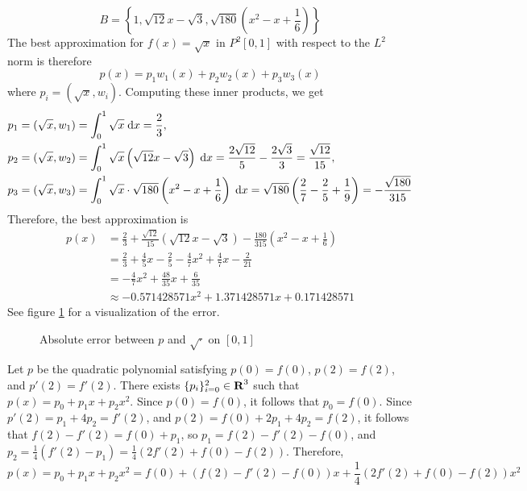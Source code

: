 \documentclass{homework}
\begin{document}
	\begin{equation}
		B = \left\{1, \sqrt{12}x - \sqrt{3}, \sqrt{180}\left(x^2-x+\frac{1}{6}\right)\right\}
	\end{equation}
	The best approximation for $f(x) = \sqrt{x}$ in $P^2[0,1]$ with respect to the $L^2$ norm is therefore
	\begin{equation}
		p(x) = p_1w_1(x) + p_2w_2(x) + p_3w_3(x)
	\end{equation}
	where $p_i = (\sqrt{x}, w_i)$. Computing these inner products, we get
	\begin{align}
		p_1 &= (\sqrt{x}, w_1) = \int_0^1\sqrt{x}\;\text{d} x = \frac{2}{3}, \\
		p_2 &= (\sqrt{x}, w_2) = \int_0^1\sqrt{x}\left(\sqrt{12}x - \sqrt{3}\right)\;\text{d} x = \frac{2\sqrt{12}}{5} - \frac{2\sqrt{3}}{3} = \frac{\sqrt{12}}{15}, \\
		p_3 &= (\sqrt{x}, w_3) = \int_0^1 \sqrt{x}\cdot\sqrt{180}\left(x^2 - x + \frac{1}{6}\right)\;\text{d} x = \sqrt{180}\left(\frac{2}{7} - \frac{2}{5} + \frac{1}{9}\right) = -\frac{\sqrt{180}}{315}
	\end{align}
	Therefore, the best approximation is
	\begin{align}
		p(x) &= \frac{2}{3} + \frac{\sqrt{12}}{15}\left(\sqrt{12}x - \sqrt{3}\right) - \frac{180}{315}\left(x^2-x+\frac{1}{6}\right) \\
		&= \frac{2}{3} + \frac{4}{5}x - \frac{2}{5} - \frac{4}{7}x^2 + \frac{4}{7}x - \frac{2}{21} \\
		&= -\frac{4}{7}x^2 + \frac{48}{35}x +\frac{6}{35}\\
		&\approx -0.571428571 x^2 + 1.371428571x + 0.171428571
	\end{align}
	See figure \ref{fig:best_sqrt_error} for a visualization of the error.
	\begin{figure}	
		\centering
		\caption{Absolute error between $p$ and $\sqrt{\cdot}$ on $[0,1]$}
		\label{fig:best_sqrt_error}
	\end{figure}
	
	\question Let $p$ be the quadratic polynomial satisfying $p(0) = f(0)$, $p(2) = f(2)$, and $p'(2) = f'(2)$. There exists $\{p_i\}_{i=0}^2 \in \textbf{R}^3$ such that $p(x) = p_0 + p_1x + p_2x^2$. Since $p(0) = f(0)$, it follows that $p_0 = f(0)$. Since $p'(2) = p_1 + 4p_2 = f'(2)$, and $p(2) = f(0) + 2p_1+4p_2 = f(2)$, it follows that $f(2) - f'(2) = f(0) + p_1$, so $p_1 = f(2) - f'(2) - f(0)$, and $p_2 = \frac{1}{4}(f'(2) - p_1) = \frac{1}{4}(2f'(2)+f(0) - f(2))$. Therefore,
	\begin{equation}
		p(x) = p_0 + p_1x + p_2x^2 = f(0) + (f(2) - f'(2) - f(0))x + \frac{1}{4}(2f'(2) + f(0) - f(2))x^2
	\end{equation}
\end{document}
